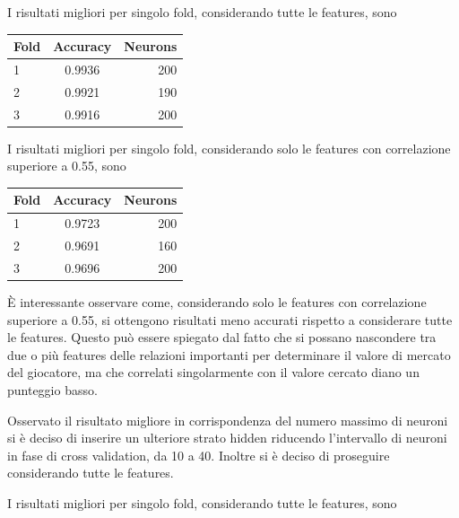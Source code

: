 \documentclass[12pt]{report}
\begin{document}
I risultati migliori per singolo fold, considerando tutte le features, sono
\begin{center}
\begin{tabular}{lcr}
\toprule
Fold & Accuracy & Neurons \\
\midrule
1  & 0.9936 & 200\\
2  & 0.9921 & 190\\
3  & 0.9916 & 200\\
\bottomrule
\end{tabular}
\end{center}

\par\null\par
\par\null\par

I risultati migliori per singolo fold, considerando solo le features con correlazione superiore a 0.55, sono

\begin{center}
\begin{tabular}{lcr}
\toprule
Fold & Accuracy & Neurons \\
\midrule
1  & 0.9723 & 200\\
2  & 0.9691 & 160\\
3  & 0.9696 & 200\\
\bottomrule
\end{tabular}
\end{center}

\par\null\par

È interessante osservare come, considerando solo le features con correlazione superiore a 0.55, si ottengono risultati meno accurati rispetto a considerare tutte le features. Questo può essere spiegato dal fatto che si possano nascondere tra due o più features delle relazioni importanti per determinare il valore di mercato del giocatore, ma che correlati singolarmente con il valore cercato diano un punteggio basso.

Osservato il risultato migliore in corrispondenza del numero massimo di neuroni si è deciso di inserire un ulteriore strato hidden riducendo l'intervallo di neuroni in fase di cross validation, da 10 a 40.
Inoltre si è deciso di proseguire considerando tutte le features.

I risultati migliori per singolo fold, considerando tutte le features, sono

\par\null\par
\end{document}
